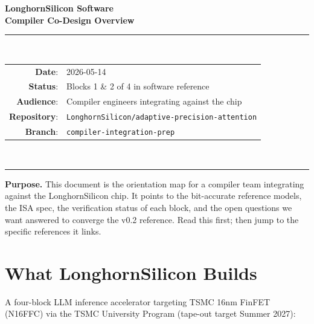 \documentclass[11pt]{article}
\begin{document}
\thispagestyle{empty}
\begin{center}
\vspace*{1.2in}
{\Huge\bfseries LonghornSilicon Software}\\[0.4em]
{\LARGE\bfseries Compiler Co-Design Overview}\\[1.5em]

\rule{0.7\textwidth}{0.4pt}\\[1em]

\begin{tabular}{rl}
\textbf{Date}:           & 2026-05-14 \\
\textbf{Status}:         & Blocks 1 \& 2 of 4 in software reference \\
\textbf{Audience}:       & Compiler engineers integrating against the chip \\
\textbf{Repository}:     & \texttt{LonghornSilicon/adaptive-precision-attention} \\
\textbf{Branch}:         & \texttt{compiler-integration-prep} \\
\end{tabular}\\[1em]
\rule{0.7\textwidth}{0.4pt}

\vfill
\begin{minipage}{0.85\textwidth}
\small
\textbf{Purpose.} This document is the orientation map for a compiler
team integrating against the LonghornSilicon chip. It points to the
bit-accurate reference models, the ISA spec, the verification status
of each block, and the open questions we want answered to converge
the v0.2 reference. Read this first; then jump to the specific
references it links.
\end{minipage}

\vspace{0.3in}
\end{center}

\clearpage

\tableofcontents
\clearpage

\section{What LonghornSilicon Builds}
\label{sec:what}

A four-block LLM inference accelerator targeting TSMC 16nm FinFET (N16FFC) via the
TSMC University Program (tape-out target Summer 2027):
\end{document}
